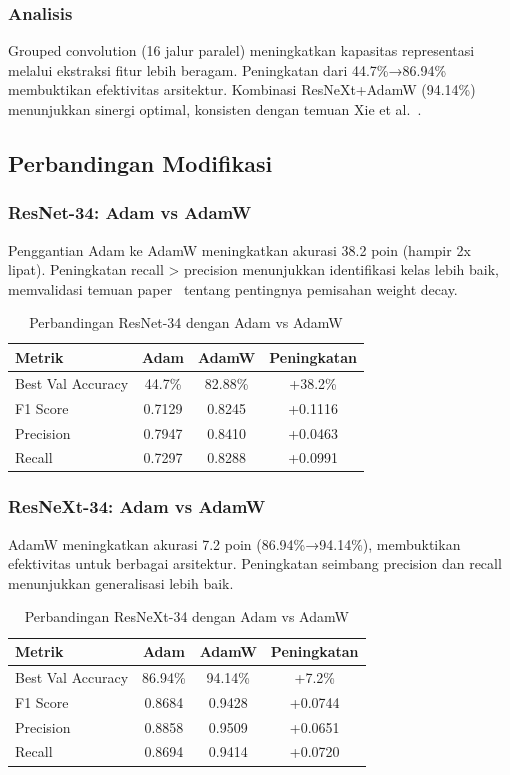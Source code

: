 \documentclass[11pt,a4paper]{article}
\begin{document}
\subsubsection{Analisis}
Grouped convolution (16 jalur paralel) meningkatkan kapasitas representasi melalui ekstraksi fitur lebih beragam. Peningkatan dari 44.7\%→86.94\% membuktikan efektivitas arsitektur. Kombinasi ResNeXt+AdamW (94.14\%) menunjukkan sinergi optimal, konsisten dengan temuan Xie et al.~\cite{xie2017aggregated}.

\subsection{Perbandingan Modifikasi}
\subsubsection{ResNet-34: Adam vs AdamW}
Penggantian Adam ke AdamW meningkatkan akurasi 38.2 poin (hampir 2x lipat). Peningkatan recall > precision menunjukkan identifikasi kelas lebih baik, memvalidasi temuan paper~\cite{loshchilov2017decoupled} tentang pentingnya pemisahan weight decay.
\begin{table}[h]
\centering
\caption{Perbandingan ResNet-34 dengan Adam vs AdamW}
\begin{tabular}{|l|c|c|c|}
\hline
\textbf{Metrik} & \textbf{Adam} & \textbf{AdamW} & \textbf{Peningkatan} \\ \hline
Best Val Accuracy & 44.7\% & 82.88\% & +38.2\% \\ \hline
F1 Score & 0.7129 & 0.8245 & +0.1116 \\ \hline
Precision & 0.7947 & 0.8410 & +0.0463 \\ \hline
Recall & 0.7297 & 0.8288 & +0.0991 \\ \hline
\end{tabular}
\end{table}

\subsubsection{ResNeXt-34: Adam vs AdamW}
AdamW meningkatkan akurasi 7.2 poin (86.94\%→94.14\%), membuktikan efektivitas untuk berbagai arsitektur. Peningkatan seimbang precision dan recall menunjukkan generalisasi lebih baik.
\begin{table}[h]
\centering
\caption{Perbandingan ResNeXt-34 dengan Adam vs AdamW}
\begin{tabular}{|l|c|c|c|}
\hline
\textbf{Metrik} & \textbf{Adam} & \textbf{AdamW} & \textbf{Peningkatan} \\ \hline
Best Val Accuracy & 86.94\% & 94.14\% & +7.2\% \\ \hline
F1 Score & 0.8684 & 0.9428 & +0.0744 \\ \hline
Precision & 0.8858 & 0.9509 & +0.0651 \\ \hline
Recall & 0.8694 & 0.9414 & +0.0720 \\ \hline
\end{tabular}
\end{table}
\end{document}
